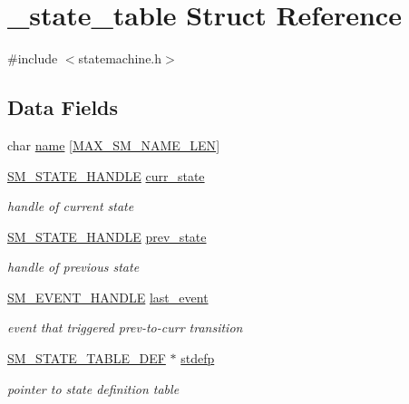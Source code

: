 \hypertarget{struct__state__table}{\section{\-\_\-state\-\_\-table Struct Reference}
\label{struct__state__table}
}


{\ttfamily \#include $<$statemachine.\-h$>$}

\subsection*{Data Fields}
\begin{DoxyCompactItemize}
\item 
char \hyperlink{struct__state__table_aef62a5c3d3f28b912cb9864df5c8cd4f}{name} \mbox{[}\hyperlink{statemachine_8h_a13c4f043ac1358c6782b02f76ff96135}{M\-A\-X\-\_\-\-S\-M\-\_\-\-N\-A\-M\-E\-\_\-\-L\-E\-N}\mbox{]}
\item 
\hyperlink{statemachine_8h_aa30fadf137d8a09eceea2a2d973be5ef}{S\-M\-\_\-\-S\-T\-A\-T\-E\-\_\-\-H\-A\-N\-D\-L\-E} \hyperlink{struct__state__table_ac8a2e6d648912c3c020a4586cc8d1bc6}{curr\-\_\-state}
\begin{DoxyCompactList}\small\item\em handle of current state \end{DoxyCompactList}\item 
\hyperlink{statemachine_8h_aa30fadf137d8a09eceea2a2d973be5ef}{S\-M\-\_\-\-S\-T\-A\-T\-E\-\_\-\-H\-A\-N\-D\-L\-E} \hyperlink{struct__state__table_a1013e51e490d3d448cb2c1475ff12b72}{prev\-\_\-state}
\begin{DoxyCompactList}\small\item\em handle of previous state \end{DoxyCompactList}\item 
\hyperlink{statemachine_8h_acb17336d3c3a21ee8233cec54bb55b4f}{S\-M\-\_\-\-E\-V\-E\-N\-T\-\_\-\-H\-A\-N\-D\-L\-E} \hyperlink{struct__state__table_ad112b231e51775715b689dad71491f10}{last\-\_\-event}
\begin{DoxyCompactList}\small\item\em event that triggered prev-\/to-\/curr transition \end{DoxyCompactList}\item 
\hyperlink{struct_s_m___s_t_a_t_e___t_a_b_l_e___d_e_f}{S\-M\-\_\-\-S\-T\-A\-T\-E\-\_\-\-T\-A\-B\-L\-E\-\_\-\-D\-E\-F} $\ast$ \hyperlink{struct__state__table_a95b706e8e406f433cf52c010bdcdd8d3}{stdefp}
\begin{DoxyCompactList}\small\item\em pointer to state definition table \end{DoxyCompactList}\item 

\end{DoxyCompactItemize}
